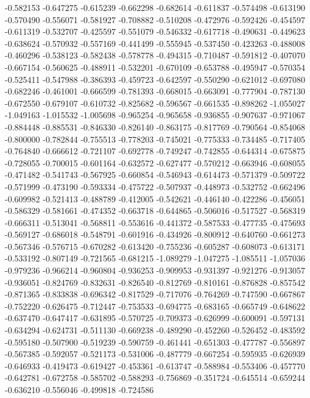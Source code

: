 -0.582153
-0.647275
-0.615239
-0.662298
-0.682614
-0.611837
-0.574498
-0.613190
-0.570490
-0.556071
-0.581927
-0.708882
-0.510208
-0.472976
-0.592426
-0.454597
-0.611319
-0.532707
-0.425597
-0.551079
-0.546332
-0.617718
-0.490631
-0.449623
-0.638624
-0.570932
-0.557169
-0.441499
-0.555945
-0.537450
-0.423263
-0.488008
-0.460296
-0.538123
-0.582438
-0.578778
-0.494315
-0.710487
-0.591812
-0.407070
-0.667154
-0.560625
-0.488911
-0.532201
-0.670109
-0.653788
-0.495947
-0.570354
-0.525411
-0.547988
-0.386393
-0.459723
-0.642597
-0.550290
-0.621012
-0.697080
-0.682246
-0.461001
-0.666599
-0.781393
-0.668015
-0.663091
-0.777904
-0.787130
-0.672550
-0.679107
-0.610732
-0.825682
-0.596567
-0.661535
-0.898262
-1.055027
-1.049163
-1.015532
-1.005698
-0.965254
-0.965658
-0.936855
-0.907637
-0.971067
-0.884448
-0.885531
-0.846330
-0.826140
-0.863175
-0.817769
-0.790564
-0.854068
-0.800000
-0.782844
-0.755513
-0.778203
-0.745021
-0.775333
-0.734485
-0.717405
-0.764840
-0.666612
-0.721107
-0.692778
-0.749247
-0.742855
-0.644314
-0.675875
-0.728055
-0.700015
-0.601164
-0.632572
-0.627477
-0.570212
-0.663946
-0.608055
-0.471482
-0.541743
-0.567925
-0.660854
-0.546943
-0.614473
-0.571379
-0.509722
-0.571999
-0.473190
-0.593334
-0.475722
-0.507937
-0.448973
-0.532752
-0.662496
-0.609982
-0.521413
-0.488789
-0.412005
-0.542621
-0.446140
-0.422286
-0.456051
-0.586329
-0.581661
-0.474352
-0.663718
-0.644865
-0.506016
-0.517527
-0.568319
-0.666311
-0.513041
-0.568811
-0.553616
-0.441372
-0.587533
-0.477735
-0.475693
-0.569127
-0.686018
-0.548791
-0.601916
-0.434926
-0.800912
-0.640760
-0.661273
-0.567346
-0.576715
-0.670282
-0.613420
-0.755236
-0.605287
-0.608073
-0.613171
-0.533192
-0.807149
-0.721565
-0.681215
-1.089279
-1.047275
-1.085511
-1.057036
-0.979236
-0.966214
-0.960804
-0.936253
-0.909953
-0.931397
-0.921276
-0.913057
-0.936051
-0.824769
-0.832631
-0.826540
-0.812769
-0.810161
-0.876828
-0.857542
-0.871365
-0.833838
-0.696342
-0.817529
-0.717076
-0.764269
-0.747590
-0.667867
-0.752220
-0.626475
-0.712447
-0.753533
-0.694775
-0.683165
-0.665749
-0.648622
-0.637470
-0.647417
-0.631895
-0.570725
-0.709373
-0.626999
-0.600091
-0.597131
-0.634294
-0.624731
-0.511130
-0.669238
-0.489290
-0.452260
-0.526452
-0.483592
-0.595180
-0.507900
-0.519239
-0.590759
-0.461441
-0.651303
-0.477787
-0.556897
-0.567385
-0.592057
-0.521173
-0.531006
-0.487779
-0.667254
-0.595935
-0.626939
-0.646933
-0.419473
-0.619427
-0.453361
-0.613747
-0.588984
-0.553406
-0.457770
-0.642781
-0.672758
-0.585702
-0.588293
-0.756869
-0.351724
-0.645514
-0.659244
-0.636210
-0.556046
-0.499818
-0.724586
